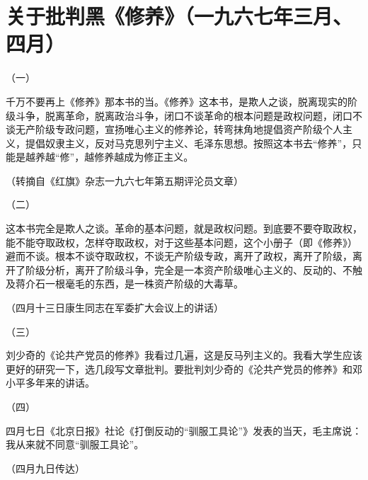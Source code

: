 \section[关于批判黑《修养》（一九六七年三月、四月）]{关于批判黑《修养》（一九六七年三月、四月）}


（一）

千万不要再上《修养》那本书的当。《修养》这本书，是欺人之谈，脱离现实的阶级斗争，脱离革命，脱离政治斗争，闭口不谈革命的根本问题是政权问题，闭口不谈无产阶级专政问题，宣扬唯心主义的修养论，转弯抹角地提倡资产阶级个人主义，提倡奴隶主义，反对马克思列宁主义、毛泽东思想。按照这本书去“修养”，只能是越养越“修”，越修养越成为修正主义。

{\raggedleft （转摘自《红旗》杂志一九六七年第五期评沦员文章）\par}

（二）

这本书完全是欺人之谈。革命的基本问题，就是政权问题。到底要不要夺取政权，能不能夺取政权，怎样夺取政权，对于这些基本问题，这个小册子（即《修养》）避而不谈。根本不谈夺取政权，不谈无产阶级专政，离开了政权，离开了阶级，离开了阶级分析，离开了阶级斗争，完全是一本资产阶级唯心主义的、反动的、不触及蒋介石一根毫毛的东西，是一株资产阶级的大毒草。

{\raggedleft （四月十三日康生同志在军委扩大会议上的讲话）\par}

（三）

刘少奇的《论共产党员的修养》我看过几遍，这是反马列主义的。我看大学生应该更好的研究一下，选几段写文章批判。要批判刘少奇的《沦共产党员的修养》和邓小平多年来的讲话。

（四）

四月七日《北京日报》社论《打倒反动的“驯服工具论”》发表的当天，毛主席说：我从来就不同意“驯服工具论”。

{\raggedleft （四月九日传达）\par}


